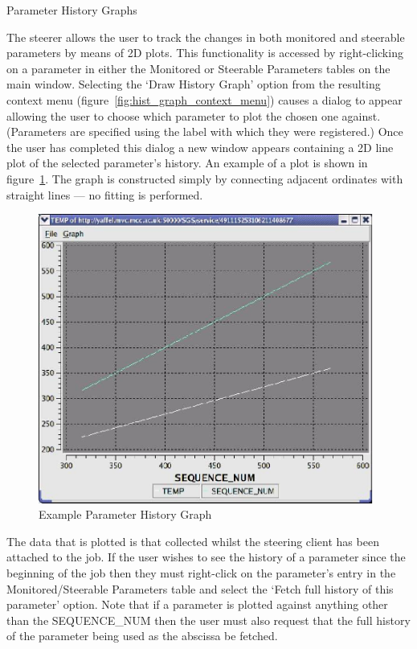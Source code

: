 \documentclass[a4paper,twoside]{article}
\begin{document}

\begin{section}{Parameter History Graphs}
\label{sec:hist_graphs}

The steerer allows the user to track the changes in both monitored and
steerable parameters by means of 2D plots.  This functionality is
accessed by right-clicking on a parameter in either the Monitored or
Steerable Parameters tables on the main window.  Selecting the `Draw
History Graph' option from the resulting context menu
(figure~\ref{fig:hist_graph_context_menu}) causes a dialog to appear allowing
the user to choose which parameter to plot the chosen one against.
(Parameters are specified using the label with which they were
registered.)  Once the user has completed this dialog a new window
appears containing a 2D line plot of the selected parameter's
history. An example of a plot is shown in
figure~\ref{fig:eg_param_hist_plot}.  The graph is constructed simply
by connecting adjacent ordinates with straight lines --- no fitting is
performed.

\begin{figure}
\centerline{\includegraphics[width=11cm]{hist_plot_2curves.eps}}
\caption{Example Parameter History Graph}
\label{fig:eg_param_hist_plot}
\end{figure}

The data that is plotted is that collected whilst the steering client
has been attached to the job. If the user wishes to see the history of
a parameter since the beginning of the job then they must right-click
on the parameter's entry in the Monitored/Steerable Parameters table
and select the `Fetch full history of this parameter' option.  Note
that if a parameter is plotted against anything other than the
SEQUENCE\_NUM then the user must also request that the full history of
the parameter being used as the abscissa be fetched.


\end{section}
\end{document}
